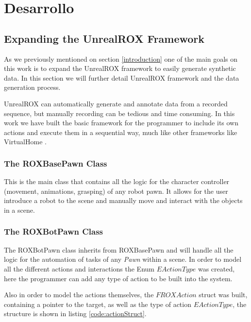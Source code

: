 
\chapter{Desarrollo}
\label{desarrollo}

\section{Expanding the UnrealROX Framework}
As we previously mentioned on section \ref{introduction} one of the main goals on this work is to expand the UnrealROX framework to easily generate synthetic data. In this section we will further detail UnrealROX framework and the data generation process.

UnrealROX can automatically generate and annotate data from a recorded sequence, but manually recording can be tedious and time consuming. In this work we have built the basic framework for the programmer to include its own actions and execute them in a sequential way, much like other frameworks like VirtualHome \cite{virtualhome2018}. 

\subsection{The ROXBasePawn Class}
This is the main class that contains all the logic for the character controller (movement, animations, grasping) of any robot pawn. It allows for the user introduce a robot to the scene and manually move and interact with the objects in a scene.

\subsection{The ROXBotPawn Class}
The ROXBotPawn class inherits from ROXBasePawn and will handle all the logic for the automation of tasks of any \textit{Pawn} within a scene. In order to model all the different actions and interactions the Enum $EActionType$ was created, here the programmer can add any type of action to be built into the system.

Also in order to model the actions themselves, the $FROXAction$ struct was built, containing a pointer to the target, as well as the type of action $EActionType$, the structure is shown in listing \ref{code:actionStruct}.


